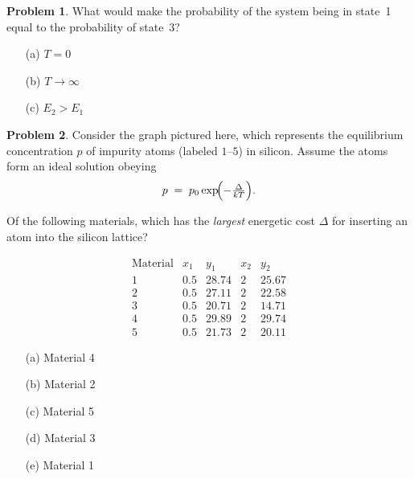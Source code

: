 \documentclass[10pt]{article}
\theoremstyle{definition} %
\newtheorem{problem}{Problem}
\theoremstyle{plain} %
\begin{document}
  \begin{problem}
  What would make the probability of the system being in state~1 equal to
  the probability of state~3?
  
  \begin{enumerate}
    \item[(a)] $T = 0$
    \item[(b)] $T \to \infty$
    \item[(c)] $E_{2} > E_{1}$
  \end{enumerate}
  \end{problem}
  \begin{problem}
    Consider the graph pictured here, which represents the equilibrium concentration \(p\) of impurity atoms (labeled \(1\text{–}5\)) in silicon.  
    Assume the atoms form an ideal solution obeying
    \[
       p \;=\; p_{0}\exp\!\Bigl(-\tfrac{\Delta}{kT}\Bigr).
    \]
    
    Of the following materials, which has the \emph{largest} energetic cost \(\Delta\) for inserting an atom into the silicon lattice?
    
    \[
    \begin{array}{c|cc|cc}
    \text{Material} & x_{1} & y_{1} & x_{2} & y_{2}\\ \hline
    1 & 0.5 & 28.74 & 2 & 25.67\\
    2 & 0.5 & 27.11 & 2 & 22.58\\
    3 & 0.5 & 20.71 & 2 & 14.71\\
    4 & 0.5 & 29.89 & 2 & 29.74\\
    5 & 0.5 & 21.73 & 2 & 20.11
    \end{array}
    \]
    
    \begin{enumerate}
      \item[(a)] Material 4
      \item[(b)] Material 2
      \item[(c)] Material 5
      \item[(d)] Material 3
      \item[(e)] Material 1
    \end{enumerate}
    \end{problem}
\end{document}
